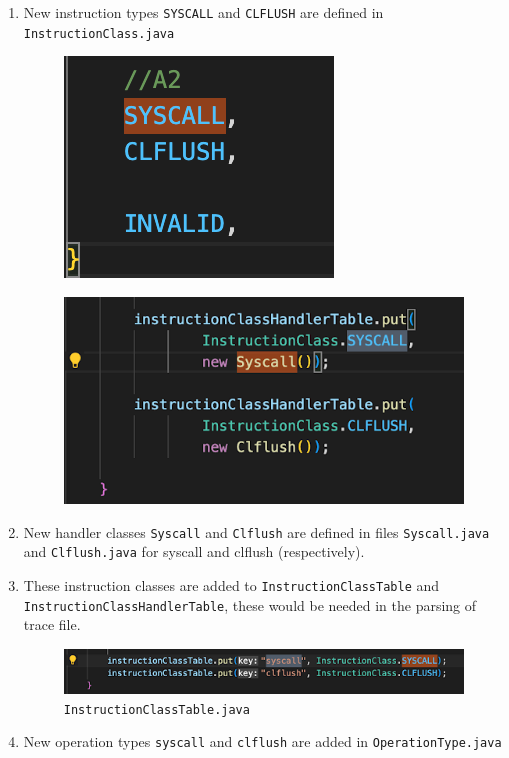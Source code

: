 \documentclass[11pt]{article}
\begin{document}
\begin{enumerate}
    \item New instruction types \texttt{SYSCALL} and \texttt{CLFLUSH} are defined in \texttt{InstructionClass.java}
\begin{figure}
\centering
\begin{minipage}{.5\textwidth}
  \centering
  \includegraphics[width=0.6\linewidth]{screenshots/InstructionClass.png}
  \label{fig:IC}
\end{minipage}%
\begin{minipage}{.55\textwidth}
  \centering
  \includegraphics[width=0.8\linewidth]{screenshots/InstructionClassTable2.png}
  \label{fig:ICT2}
\end{minipage}
\end{figure}
    \item New handler classes \texttt{Syscall} and \texttt{Clflush} are defined in files \texttt{Syscall.java} and \texttt{Clflush.java} for syscall and clflush  (respectively).  
    \item These instruction classes  are added to \texttt{InstructionClassTable} and \texttt{InstructionClassHandlerTable}, these would be needed in the parsing of trace file.
\begin{figure}[H]
\centering
\includegraphics[scale = 0.8]{screenshots/InstructionClassTable1.png}
\caption{\texttt{InstructionClassTable.java}}
\label{fig:ICT1}
\end{figure}
    \item New operation types \texttt{syscall} and \texttt{clflush} are added in \texttt{OperationType.java}
    

\end{enumerate}
\end{document}
